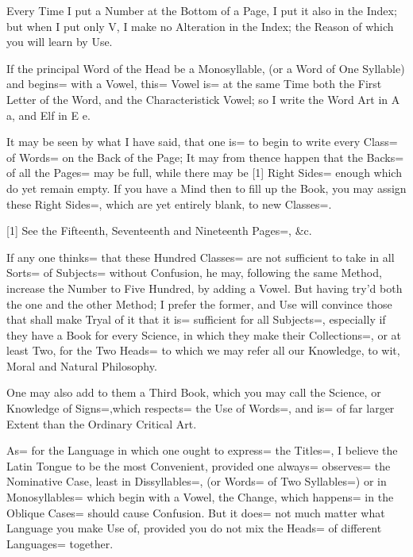 Every Time I put a Number at the Bottom of a Page, I put it also in the Index;
but when I put only V, I make no Alteration in the Index;
the Reason of which you will learn by Use.

If the principal Word of the Head be a Monosyllable, (or a Word of One Syllable) and begins= with a Vowel, this= Vowel is= at the same Time both the First Letter of the Word, and the Characteristick Vowel;
so I write the Word Art in A a, and Elf in E e.

It may be seen by what I have said, that one is= to begin to write every Class= of Words= on the Back of the Page;
It may from thence happen that the Backs= of all the Pages= may be full, while there may be [1]
Right Sides= enough which do yet remain empty.
If you have a Mind then to fill up the Book, you may assign these Right Sides=, which are yet entirely blank, to new Classes=.

[1]
See the Fifteenth, Seventeenth and Nineteenth Pages=, \&c.

If any one thinks= that these Hundred Classes= are not sufficient to take in all Sorts= of Subjects= without Confusion, he may, following the same Method, increase the Number to Five Hundred, by adding a Vowel.
But having try'd both the one and the other Method;
I prefer the former, and Use will convince those that shall make Tryal of it that it is= sufficient for all Subjects=, especially if they have a Book for every Science, in which they make their Collections=, or at least Two, for the Two Heads= to which we may refer all our Knowledge, to wit, Moral and Natural Philosophy.

One may also add to them a Third Book, which you may call the Science, or Knowledge of Signs=,which respects= the Use of Words=, and is= of far larger Extent than the Ordinary Critical Art.

As= for the Language in which one ought to express= the Titles=, I believe the Latin Tongue to be the most Convenient, provided one always= observes= the Nominative Case, least in Dissyllables=, (or Words= of Two Syllables=) or in Monosyllables= which begin with a Vowel, the Change, which happens= in the Oblique Cases= should cause Confusion.
But it does= not much matter what Language you make Use of, provided you do not mix the Heads= of different Languages= together.

